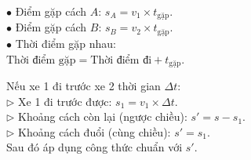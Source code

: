 \documentclass[14pt,a4paper,oneside]{extbook}
\begin{document}
\vspace{3mm}

\noindent
\begin{minipage}[t]{0.52\textwidth}
  \begin{tcolorbox}[
    enhanced,
    title={\footnotesize\bfseries\color{white}\faMapMarker\ 2. Vị trí điểm gặp nhau},
    colback=teal!2!white,
    colframe=teal!75!black,
    arc=2.5mm, boxrule=0.8pt, top=1.8mm, bottom=1.8mm, left=2.2mm, right=2.2mm
  ]
    \footnotesize
    $\bullet$ Điểm gặp cách $A$: $s_A = v_1 \times t_{\text{gặp}}$.\\
    $\bullet$ Điểm gặp cách $B$: $s_B = v_2 \times t_{\text{gặp}}$.\\
    $\bullet$ Thời điểm gặp nhau:\\
    $\text{Thời điểm gặp} = \text{Thời điểm đi} + t_{\text{gặp}}$.
  \end{tcolorbox}
\end{minipage}%
\hfill
\begin{minipage}[t]{0.46\textwidth}
  \begin{tcolorbox}[
    enhanced,
    title={\footnotesize\bfseries\color{white}\faClockO\ 3. Xuất phát KHÔNG cùng lúc},
    colback=purple!2!white,
    colframe=purple!70!black,
    arc=2.5mm, boxrule=0.8pt, top=1.8mm, bottom=1.8mm, left=2mm, right=2mm
  ]
    \footnotesize
    Nếu xe 1 đi trước xe 2 thời gian $\Delta t$:\\
    $\triangleright$ Xe 1 đi trước được: $s_1 = v_1 \times \Delta t$.\\
    $\triangleright$ Khoảng cách còn lại (ngược chiều): $s' = s - s_1$.\\
    $\triangleright$ Khoảng cách đuổi (cùng chiều): $s' = s_1$.\\
    Sau đó áp dụng công thức chuẩn với $s'$.
  \end{tcolorbox}
\end{minipage}

\vspace{3mm}
\end{document}
